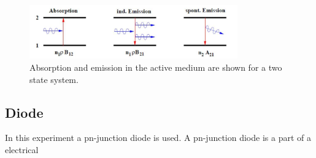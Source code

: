 \begin{figure}
    \center
    \includegraphics[width=0.8\textwidth]{bilder/emission.jpg}
    \caption{Absorption and emission in the active medium are shown for a two state system. \cite{anleitungHeNe}}
    \label{fig:emission}
\end{figure}

\subsection{Diode}
In this experiment a pn-junction diode is used.
A pn-junction diode is a part of a electrical 